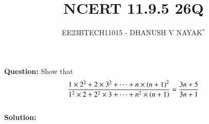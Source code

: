 \documentclass[journal,12pt,twocolumn]{IEEEtran}
\theoremstyle{remark}
\begin{document}

\vspace{3cm}

\title{NCERT 11.9.5 26Q}
\author{EE23BTECH11015 - DHANUSH V NAYAK$^{*}$%
}
\maketitle
\newpage
\bigskip

\renewcommand{\thefigure}{\theenumi}
\renewcommand{\thetable}{\theenumi}


\textbf{Question:} Show that
\begin{equation}
    \frac{1\times2^2 + 2\times3^2 + \dots + n\times\left(n+1\right)^2}{1^2\times2 + 2^2\times3 +\dots + n^2\times\left(n+1\right)}  = \frac{3n+5}{3n+1}\notag
\end{equation}\\
\textbf{Solution:}\\
\end{document}
